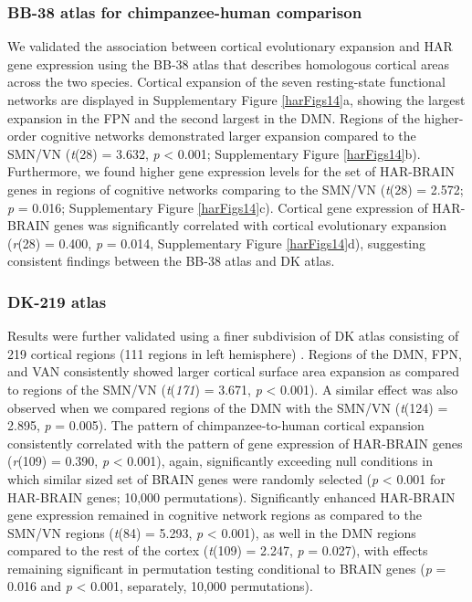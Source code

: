 \begin{refsection}
\subsubsection*{BB-38 atlas for chimpanzee-human comparison}
We validated the association between cortical evolutionary expansion and HAR gene expression using the BB-38 atlas that describes homologous cortical areas across the two species. Cortical expansion of the seven resting-state functional networks are displayed in Supplementary Figure \ref{harFigs14}a, showing the largest expansion in the FPN and the second largest in the DMN. Regions of the higher-order cognitive networks demonstrated larger expansion compared to the SMN/VN (\textit{t}(28) = 3.632, \textit{p} < 0.001; Supplementary Figure \ref{harFigs14}b). Furthermore, we found higher gene expression levels for the set of HAR-BRAIN genes in regions of cognitive networks comparing to the SMN/VN (\textit{t}(28) = 2.572; \textit{p} = 0.016; Supplementary Figure \ref{harFigs14}c). Cortical gene expression of HAR-BRAIN genes was significantly correlated with cortical evolutionary expansion (\textit{r}(28) = 0.400, \textit{p} = 0.014, Supplementary Figure \ref{harFigs14}d), suggesting consistent findings between the BB-38 atlas and DK atlas.

\subsubsection*{DK-219 atlas}
Results were further validated using a finer subdivision of DK atlas consisting of 219 cortical regions (111 regions in left hemisphere) \citep{DESIKAN2006968,CAMMOUN2012386}. Regions of the DMN, FPN, and VAN consistently showed larger cortical surface area expansion as compared to regions of the SMN/VN (\textit{t}(\textit{171}) = 3.671, \textit{p} < 0.001). A similar effect was also observed when we compared regions of the DMN with the SMN/VN (\textit{t}(124) = 2.895, \textit{p} = 0.005). The pattern of chimpanzee-to-human cortical expansion consistently correlated with the pattern of gene expression of HAR-BRAIN genes (\textit{r}(109) = 0.390, \textit{p} < 0.001), again, significantly exceeding null conditions in which similar sized set of BRAIN genes were randomly selected (\textit{p} < 0.001 for HAR-BRAIN genes; 10,000 permutations). Significantly enhanced HAR-BRAIN gene expression remained in cognitive network regions as compared to the SMN/VN regions (\textit{t}(84) = 5.293, \textit{p} < 0.001), as well in the DMN regions compared to the rest of the cortex (\textit{t}(109) = 2.247, \textit{p} = 0.027), with effects remaining significant in permutation testing conditional to BRAIN genes (\textit{p} = 0.016 and \textit{p} < 0.001, separately, 10,000 permutations).


\end{refsection}
